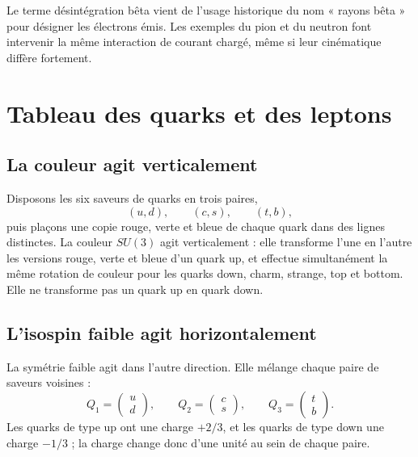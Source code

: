 Le terme désintégration bêta vient de l’usage historique du nom « rayons bêta » pour désigner les électrons émis. Les exemples du pion et du neutron font intervenir la même interaction de courant chargé, même si leur cinématique diffère fortement.

\section{Tableau des quarks et des leptons}

\subsection{La couleur agit verticalement}

Disposons les six saveurs de quarks en trois paires,
\begin{equation}
(u,d),\qquad(c,s),\qquad(t,b),
\end{equation}
puis plaçons une copie rouge, verte et bleue de chaque quark dans des lignes distinctes. La couleur \(SU(3)\) agit verticalement : elle transforme l’une en l’autre les versions rouge, verte et bleue d’un quark up, et effectue simultanément la même rotation de couleur pour les quarks down, charm, strange, top et bottom. Elle ne transforme pas un quark up en quark down.

\subsection{L’isospin faible agit horizontalement}

La symétrie faible agit dans l’autre direction. Elle mélange chaque paire de saveurs voisines :
\begin{equation}
Q_1=\begin{pmatrix}u\\d\end{pmatrix},
\qquad
Q_2=\begin{pmatrix}c\\s\end{pmatrix},
\qquad
Q_3=\begin{pmatrix}t\\b\end{pmatrix}.
\label{eq:l5-quark-doublets}
\end{equation}
Les quarks de type up ont une charge \(+2/3\), et les quarks de type down une charge \(-1/3\) ; la charge change donc d’une unité au sein de chaque paire.

